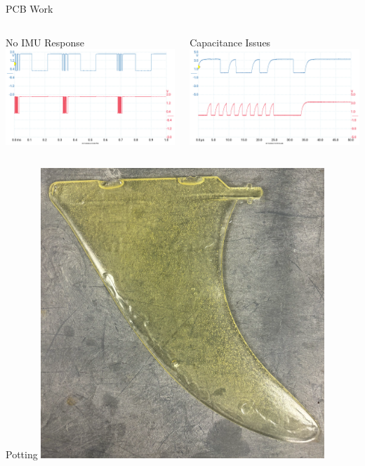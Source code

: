 \begin{frame}{PCB Work}
    \begin{columns}
        \begin{column}{0.5\textwidth}
            No IMU Response
            \includegraphics[height=1\textheight,width=1\textwidth,keepaspectratio]{images/IMU_SDA_SCL_NoData.png}
        \end{column}
        \begin{column}{0.5\textwidth}
            Capacitance Issues
            \includegraphics[height=1\textheight,width=1\textwidth,keepaspectratio]{images/PreResistorChange_Both.png}
        \end{column}
    \end{columns}
\end{frame}

\begin{frame}{Potting}
    \centering
    \includegraphics[height=0.8\textheight,width=0.8\textwidth,keepaspectratio]{images/Epoxy_fin.png}
\end{frame}
